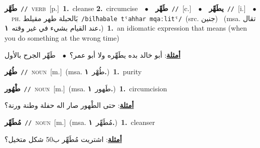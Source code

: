 \documentclass[10pt,a4paper,twoside]{article} %
\begin{document}
\begin{multicols}{2}
{\setlength\topsep{0pt}\textbf{\foreignlanguage{arabic}{طَهَّر}}\ {\color{gray}\texttt{//}\color{black}}\ \textsc{verb}\ [p.]\ \textbf{1.}~cleanse  \textbf{2.}~circumcise\ \ $\bullet$\ \ \setlength\topsep{0pt}\textbf{\foreignlanguage{arabic}{طَهِّر}}\ {\color{gray}\texttt{//}\color{black}}\ [c.]\ \ $\bullet$\ \ \setlength\topsep{0pt}\textbf{\foreignlanguage{arabic}{يطَهِّر}}\ {\color{gray}\texttt{//}\color{black}}\ [i.]\ \ $\bullet$\ \ \textsc{ph.} \color{gray} \foreignlanguage{arabic}{بَالحبلة طهر مقيلط}\color{black}\ {\color{gray}\texttt{/{\sffamily bilħabale tˤahhar mqaːlitˤ}/}\color{black}}\ \color{gray}(src. \foreignlanguage{arabic}{جنين})\color{black}\ \color{gray} (msa. \foreignlanguage{arabic}{تقال عند القيام بشيء في غير وقته}~\foreignlanguage{arabic}{\textbf{١.}})\color{black}\ \textbf{1.}~an idiomatic expression that means (when you do something at the wrong time)\  \begin{flushright}\color{gray}\foreignlanguage{arabic}{\textbf{\underline{\foreignlanguage{arabic}{أمثلة}}}: أبو خالد بده يطَهِّره ولا أبو عمر؟\ $\bullet$\ \  طَهِّر الجرح بالأول}\end{flushright}\color{black}} \vspace{2mm}

{\setlength\topsep{0pt}\textbf{\foreignlanguage{arabic}{طُهُر}}\ {\color{gray}\texttt{//}\color{black}}\ \textsc{noun}\ [m.]\ \color{gray}(msa. \foreignlanguage{arabic}{طُهْر}~\foreignlanguage{arabic}{\textbf{١.}})\color{black}\ \textbf{1.}~purity\ } \vspace{2mm}

{\setlength\topsep{0pt}\textbf{\foreignlanguage{arabic}{طْهُور}}\ {\color{gray}\texttt{//}\color{black}}\ \textsc{noun}\ [m.]\ \color{gray}(msa. \foreignlanguage{arabic}{طَهور}~\foreignlanguage{arabic}{\textbf{١.}})\color{black}\ \textbf{1.}~circumcision\  \begin{flushright}\color{gray}\foreignlanguage{arabic}{\textbf{\underline{\foreignlanguage{arabic}{أمثلة}}}: حتى الطْهور صار اله حفلة وطنة ورنة؟}\end{flushright}\color{black}} \vspace{2mm}

{\setlength\topsep{0pt}\textbf{\foreignlanguage{arabic}{مُطَهِّر}}\ {\color{gray}\texttt{//}\color{black}}\ \textsc{noun}\ [m.]\ \color{gray}(msa. \foreignlanguage{arabic}{مُطَهِّر}~\foreignlanguage{arabic}{\textbf{١.}})\color{black}\ \textbf{1.}~cleanser\  \begin{flushright}\color{gray}\foreignlanguage{arabic}{\textbf{\underline{\foreignlanguage{arabic}{أمثلة}}}: اشتريت مُطَهِّر ب50 شكل متخيل؟}\end{flushright}\color{black}} \vspace{2mm}


\end{multicols}
\end{document}
